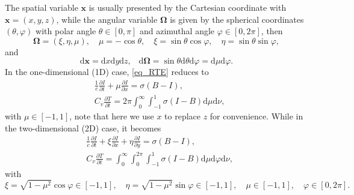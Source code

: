 \documentclass[preprint,12pt]{elsarticle}
\theoremstyle{definition}
\theoremstyle{plain}
\numberwithin{equation}{section}
\numberwithin{algorithm}{section}
\newcounter{eq_count}
\newcommand{\vOmega}{\mathbf{\Omega}}
\newcommand{\vx}{\mathbf{x}}
\newcommand{\dd}{{\text{d}}}
\newcommand{\pdrv}[2]{\frac{\partial{#1}}{\partial{#2}}}
\newcommand{\qc}{\text{,}\quad}
\begin{document}
The spatial variable $\vx$ is usually presented by the Cartesian coordinate with $\vx = (x,y,z)$, while the angular variable $\vOmega $ is given by the spherical coordinates $(\theta,\varphi)$ with polar angle $\theta\in[0,\pi]$ and azimuthal angle $\varphi\in[0,2\pi]$, then
\begin{equation*}
\vOmega = (\xi,\eta,\mu), \quad \mu= - \cos \theta, \quad \xi=\sin \theta \cos \varphi, \quad \eta=\sin \theta \sin \varphi,
\end{equation*}
and
\begin{equation*}
    \dd{\vx} = \dd{x}\dd{y}\dd{z} \qc \dd{\vOmega} = \sin\theta\dd{\theta}\dd{\varphi} = \dd{\mu}\dd{\varphi}.
\end{equation*}
In the one-dimensional (1D) case, \eqref{eq_RTE} reduces to
\begin{equation} \label{eq_1DRTE}
    \begin{aligned}
		&\frac{1}{c} \frac{\partial I}{\partial t}+\mu \pdrv{I}{x}=\sigma ( B -I), 
             \\ 
		&C_v \pdrv{T}{t}= 2 \pi \int_0^{\infty}  \int_{-1}^{1} \sigma(I- B) \dd{\mu}  \dd{\nu},
    \end{aligned}
\end{equation}
with $\mu\in[-1,1]$, note that here we use $x$ to replace $z$ for convenience. While in the two-dimensional (2D) case, it becomes
\begin{equation} \label{eq_2DRTE}
    \begin{aligned}
		&\frac{1}{c} \frac{\partial I}{\partial t}+\xi \pdrv{I}{x} + \eta \pdrv{I}{y}=\sigma (B -I), 
             \\ 
		&C_v \pdrv{T}{t}= \int_0^{\infty} \int_{0}^{2 \pi} \int_{-1}^{1}  \sigma(I-B) \dd{\mu} \dd{\varphi } \dd{\nu},
    \end{aligned}
\end{equation}
with
\begin{equation*}
\xi=\sqrt{1-\mu^2} \cos \varphi \in[-1,1], \quad \eta=\sqrt{1-\mu^2} \sin \varphi \in[-1,1], \quad \mu \in[-1,1], \quad \varphi \in[0,2 \pi] .
\end{equation*}
\end{document}
